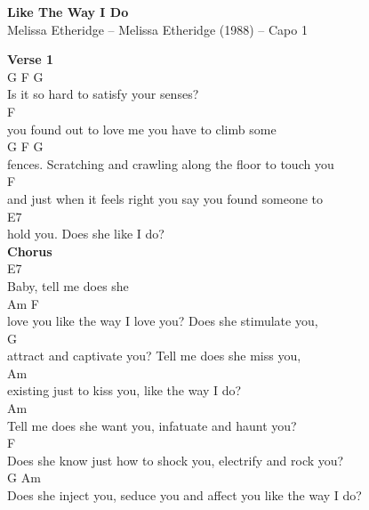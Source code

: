 \documentclass[a4paper]{article}
\begin{document}
    \begin{center}
        \textbf{Like The Way I Do}
        ~\\
        Melissa Etheridge -- Melissa Etheridge (1988)
         -- Capo 1
    \end{center}
    {
        \scriptsize
        \textbf{Verse 1}
        ~\\
        {
            \cutive
            \obeyspaces
G         F                   G
\\
 Is it so hard to satisfy your senses? 
\\
                 F
\\
you found out to love me you have to climb some  
\\
G                       F                             G
\\
fences.  Scratching and crawling along the floor to touch you 
\\
                 F
\\
and just when it feels right you say you found someone to
\\
E7
\\
hold you.  Does she like I do?
\\

        }
        \textbf{Chorus}
        ~\\
        {
            \cutive
            \obeyspaces
E7
\\
Baby, tell me does she
\\
Am                                               F
\\
love you like the way I love you?  Does she stimulate you,
\\
                                             G
\\
attract and captivate you?  Tell me does she miss you,
\\
                                          Am
\\
existing just to kiss you, like the way I do? 
\\
Am
\\
Tell me does she want you, infatuate and haunt you? 
\\
                          F
\\
Does she know just how to shock you, electrify and rock you? 
\\
           G                                                  Am
\\
Does she inject you, seduce you and affect you like the way I do?
\\

}}
\end{document}
